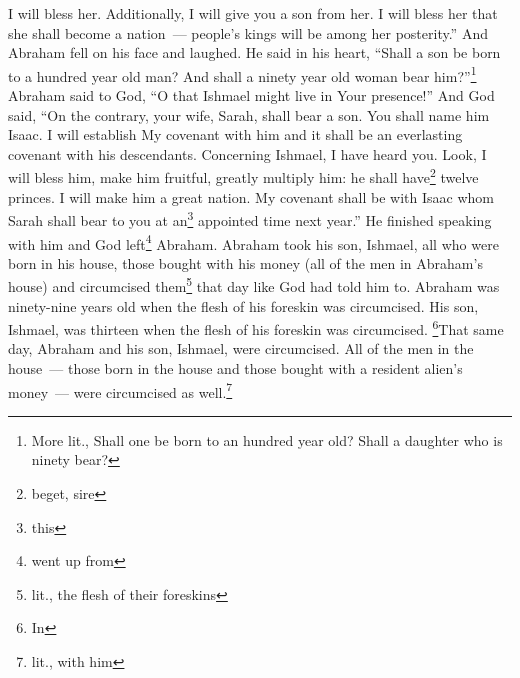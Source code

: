 \begin{enumerate}[align=center]
     I will bless her. Additionally, I will give you a son from her. I will bless her that she shall become a nation~--- people's kings will be among her posterity.''%
     And Abraham fell on his face and laughed. He said in his heart, ``Shall a son be born to a hundred year old man? And shall a ninety year old woman bear him?''\footnote{More lit., Shall one be born to an hundred year old? Shall a daughter who is ninety bear?}%
     Abraham said to God, ``O that Ishmael might live in Your presence!''%
     And God said, ``On the contrary, your wife, Sarah, shall bear a son. You shall name him Isaac. I will establish My covenant with him and it shall be an everlasting covenant with his descendants.%
     Concerning Ishmael, I have heard you. Look, I will bless him, make him fruitful, greatly multiply him: he shall have\footnote{beget, sire} twelve princes. I will make him a great nation.%
     My covenant shall be with Isaac whom Sarah shall bear to you at an\footnote{this} appointed time next year.''%
     He finished speaking with him and God left\footnote{went up from} Abraham.%
     Abraham took his son, Ishmael, all who were born in his house, those bought with his money (all of the men in Abraham's house) and circumcised them\footnote{lit., the flesh of their foreskins} that day like God had told him to.%
     Abraham was ninety-nine years old when the flesh of his foreskin was circumcised.%
     His son, Ishmael, was thirteen when the flesh of his foreskin was circumcised.%
     \footnote{In}That same day, Abraham and his son, Ishmael, were circumcised.%
     All of the men in the house~--- those born in the house and those bought with a resident alien's money~--- were circumcised as well.\footnote{lit., with him}%
\end{enumerate}
